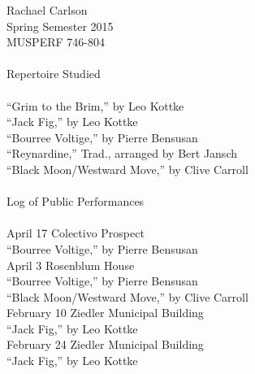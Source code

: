 \documentclass[12pt]{article}
\begin{document}
\hspace{-.6cm}Rachael Carlson \\
Spring Semester 2015 \\
MUSPERF 746-804 \\
\vspace{.5cm} \\
Repertoire Studied \\
\vspace{.25cm}\\
``Grim to the Brim,'' by Leo Kottke \\
``Jack Fig,'' by Leo Kottke \\
``Bourree Voltige,'' by Pierre Bensusan \\
``Reynardine,'' Trad., arranged by Bert Jansch \\
``Black Moon/Westward Move,'' by Clive Carroll \\
\vspace{.5cm}\\
Log of Public Performances \\
\vspace{.25cm}\\
April 17 Colectivo Prospect\\
\-\hspace{.6cm}``Bourree Voltige,'' by Pierre Bensusan\\
April 3 Rosenblum House \\
\-\hspace{.6cm}``Bourree Voltige,'' by Pierre Bensusan\\
\-\hspace{.6cm}``Black Moon/Westward Move,'' by Clive Carroll\\
February 10 Ziedler Municipal Building \\
\-\hspace{.6cm}``Jack Fig,'' by Leo Kottke\\
February 24 Ziedler Municipal Building \\
\-\hspace{.6cm}``Jack Fig,'' by Leo Kottke\\
\end{document}
